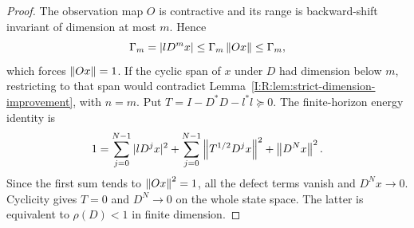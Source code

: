 \begin{proof}
The observation map $O$ is contractive and its range is backward-shift
invariant of dimension at most $m$.  Hence
\[
 \Gamma_m=|lD^mx|\le\Gamma_m\left\lVert Ox\right\rVert\le\Gamma_m,
\]
which forces $\left\lVert Ox\right\rVert=1$.  If the cyclic span of $x$ under $D$ had
dimension below $m$, restricting to that span would contradict
Lemma~\ref{I:R:lem:strict-dimension-improvement}, with $n=m$.
Put $T=I-D^*D-l^*l\succeq0$.  The finite-horizon energy identity is
\[
 1=\sum_{j=0}^{N-1}|lD^jx|^2
   +\sum_{j=0}^{N-1}\left\lVert T^{1/2}D^jx\right\rVert^2+\left\lVert D^Nx\right\rVert^2.
\]
Since the first sum tends to $\left\lVert Ox\right\rVert^2=1$, all the defect terms
vanish and $D^Nx\to0$.  Cyclicity gives $T=0$ and $D^N\to0$ on the
whole state space.  The latter is equivalent to $\rho(D)<1$ in finite
dimension.
\end{proof}
